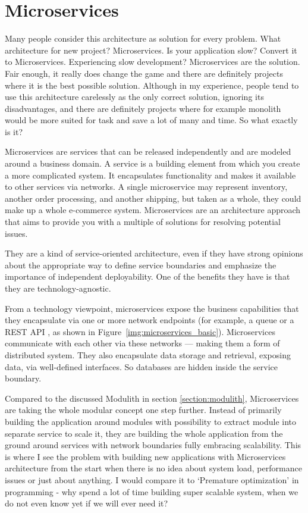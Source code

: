 \section{Microservices}
\label{section:microservices}
Many people consider this architecture as solution for every problem. What architecture for new project? Microservices. Is your application slow? Convert it to Microservices. Experiencing slow development? Microservices are the solution. Fair enough, it really does change the game and there are definitely projects where it is the best possible solution. Although in my experience, people tend to use this architecture carelessly as the only correct solution, ignoring its disadvantages, and there are definitely projects where for example monolith would be more suited for task and save a lot of many and time. So what exactly is it?


Microservices are services that can be released independently and are modeled around a business domain. A service is a building element from which you create a more complicated system. It encapsulates functionality and makes it available to other services via networks. A single microservice may represent inventory, another order processing, and another shipping, but taken as a whole, they could make up a whole e-commerce system. Microservices are an architecture approach that aims to provide you with a multiple of solutions for resolving potential issues. \cite{BUILDING_MS_WHAT_ARE}

They are a kind of service-oriented architecture, even if they have strong opinions about the appropriate way to define service boundaries and emphasize the importance of independent deployability. One of the benefits they have is that they are technology-agnostic. \cite{BUILDING_MS_WHAT_ARE}


From a technology viewpoint, microservices expose the business capabilities that they encapsulate via one or more network endpoints \cite{MON_TO_MS_MICROSERVICE} (for example, a queue or a REST API \cite{BUILDING_MS_WHAT_ARE}, as shown in Figure~\ref{img:microservices_basic}). Microservices communicate with each other via these networks — making them a form of distributed system. They also encapsulate data storage and retrieval, exposing data, via well-defined interfaces. So databases are hidden inside the service boundary. \cite{MON_TO_MS_MICROSERVICE}

Compared to the discussed Modulith in section \ref{section:modulith}, Microservices are taking the whole modular concept one step further. Instead of primarily building the application around modules with possibility to extract module into separate service to scale it, they are building the whole application from the ground around services with network boundaries fully embracing scalability. This is where I see the problem with building new applications with Microservices architecture from the start when there is no idea about system load, performance issues or just about anything. I would compare it to `Premature optimization' in programming - why spend a lot of time building super scalable system, when we do not even know yet if we will ever need it?

